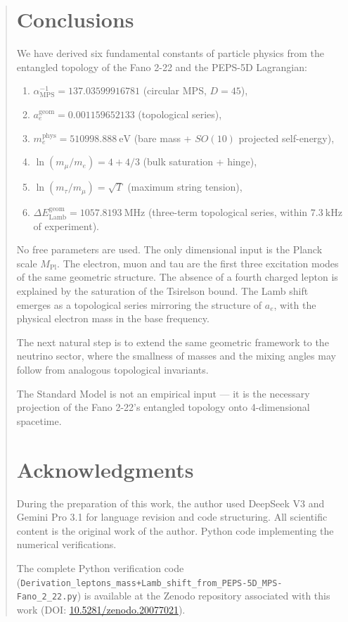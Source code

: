 \documentclass[12pt]{article}
\begin{document}
\begin{abstract}
\section{Conclusions}

We have derived six fundamental constants of particle physics from the entangled topology of the Fano 2-22 and the PEPS-5D Lagrangian:

\begin{enumerate}
  \item \(\alpha_{\text{MPS}}^{-1} = 137.03599916781\) (circular MPS, \(D=45\)),
  \item \(a_e^{\text{geom}} = 0.001159652133\) (topological series),
  \item \(m_e^{\text{phys}} = 510998.888\ \text{eV}\) (bare mass + \(SO(10)\) projected self-energy),
  \item \(\ln(m_\mu/m_e) = 4 + 4/3\) (bulk saturation + hinge),
  \item \(\ln(m_\tau/m_\mu) = \sqrt{T}\) (maximum string tension),
  \item \(\Delta E_{\text{Lamb}}^{\text{geom}} = 1057.8193\ \text{MHz}\) (three-term topological series, within \(7.3\ \text{kHz}\) of experiment).
\end{enumerate}

No free parameters are used. The only dimensional input is the Planck scale \(M_{\text{Pl}}\). The electron, muon and tau are the first three excitation modes of the same geometric structure. The absence of a fourth charged lepton is explained by the saturation of the Tsirelson bound. The Lamb shift emerges as a topological series mirroring the structure of \(a_e\), with the physical electron mass in the base frequency.

The next natural step is to extend the same geometric framework to the neutrino sector, where the smallness of masses and the mixing angles may follow from analogous topological invariants.

The Standard Model is not an empirical input — it is the necessary projection of the Fano 2-22's entangled topology onto 4-dimensional spacetime.

\section*{Acknowledgments}

During the preparation of this work, the author used DeepSeek V3 and Gemini Pro 3.1 for language revision and code structuring. All scientific content is the original work of the author. Python code implementing the numerical verifications. 
{\raggedright
The complete Python verification code 
(\texttt{Derivation\_leptons\_mass+Lamb\_shift\_from\_PEPS-5D\_MPS-Fano\_2\_22.py}) 
is available at the Zenodo repository associated with this work 
(DOI: \href{https://doi.org/10.5281/zenodo.20077021}{10.5281/zenodo.20077021}).
\par}


\end{abstract}
\end{document}
